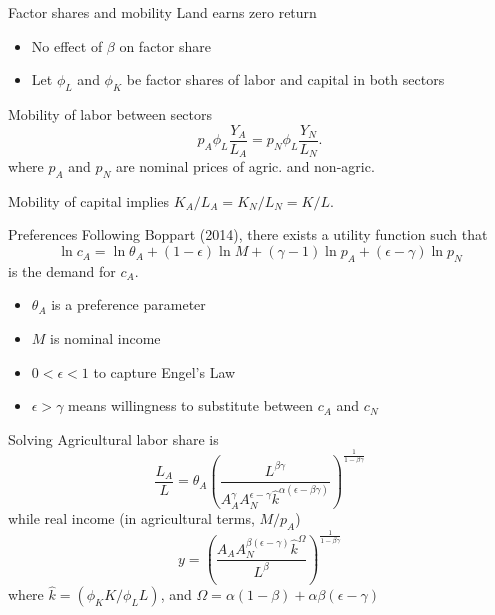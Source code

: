 \documentclass[10pt, xcolor=dvipsnames]{beamer}
\begin{document}
\begin{frame}{Factor shares and mobility}
Land earns zero return
\begin{itemize}
  \item No effect of $\beta$ on factor share
  \item Let $\phi_L$ and $\phi_K$ be factor shares of labor and capital in both sectors
\end{itemize}

\vspace{2mm} Mobility of labor between sectors
\begin{equation}
    p_A \phi_L \frac{Y_A}{L_A} = p_N \phi_L \frac{Y_N}{L_N}. \label{EQ_mobility}
\end{equation}
where $p_A$ and $p_N$ are nominal prices of agric. and non-agric.

\vspace{2mm} Mobility of capital implies $K_A/L_A = K_N/L_N = K/L$.

\end{frame}

\begin{frame}{Preferences}
Following Boppart (2014), there exists a utility function such that
\begin{equation}
    \ln c_A = \ln \theta_A + (1-\epsilon) \ln M + (\gamma - 1) \ln p_A + (\epsilon - \gamma) \ln p_N \label{EQ_ca_demand}
\end{equation}
is the demand for $c_A$.
\begin{itemize}
  \item $\theta_A$ is a preference parameter
  \item $M$ is nominal income
  \item $0 < \epsilon < 1$ to capture Engel's Law
  \item $\epsilon > \gamma$ means willingness to substitute between $c_A$ and $c_N$
\end{itemize}
\end{frame}

\begin{frame}{Solving}
Agricultural labor share is
\begin{equation}
  \frac{L_A}{L} = \theta_A \left(\frac{L^{\beta\gamma}}{A_A^{\gamma} A_N^{\epsilon - \gamma} \hat{k}^{\alpha(\epsilon - \beta\gamma)}}\right)^{\frac{1}{1-\beta\gamma}} \label{EQ_LAL}
\end{equation}
while real income (in agricultural terms, $M/p_A$)
\begin{equation}
  y = \left(\frac{A_A A_N^{\beta(\epsilon-\gamma)}\hat{k}^{\Omega}}{L^{\beta}} \right)^{\frac{1}{1-\beta\gamma}} \label{EQ_y}
\end{equation}
where $\hat{k} = (\phi_K K/\phi_L L)$, and $\Omega = \alpha(1-\beta) + \alpha\beta(\epsilon-\gamma)$
\end{frame}
\end{document}
